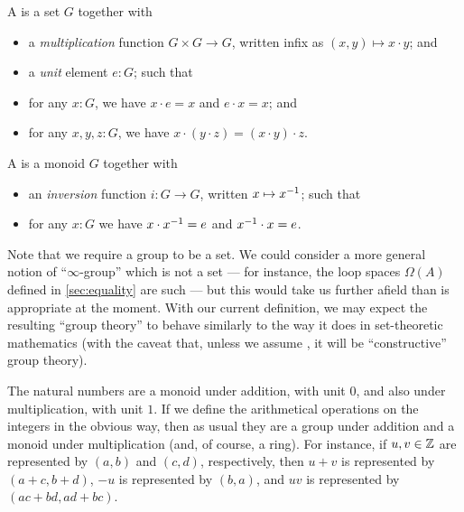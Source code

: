 \begin{defn}
  A 
  is a set $G$ together with
  \begin{itemize}
  \item a \emph{multiplication}
    function $G\times G\to G$, written infix as $(x,y) \mapsto x\cdot y$; and
  \item a \emph{unit}
    element $e:G$; such that
  \item for any $x:G$, we have $x\cdot e = x$ and $e\cdot x = x$; and
  \item for any $x,y,z:G$, we have $x\cdot (y\cdot z) = (x\cdot y)\cdot z$.
  \end{itemize}
  A 
  is a monoid $G$ together with
  \begin{itemize}
  \item an \emph{inversion} function $i:G\to G$, written $x\mapsto \mathord{{x}^{-1}}$; such that
  \item for any $x:G$ we have $x\cdot \mathord{{x}^{-1}} = e$ and $\mathord{{x}^{-1}} \cdot x = e$.
  \end{itemize}
\end{defn}

\begin{rmk}
Note that we require a group to be a set.
We could consider a more general notion of ``$\infty$-group''%
which is not a set --- for instance, the loop spaces $\Omega(A)$ defined in \autoref{sec:equality} are such --- but this would take us further afield than is appropriate at the moment.
With our current definition, we may expect the resulting ``group theory'' to behave similarly to the way it does in set-theoretic mathematics (with the caveat that, unless we assume \LEM{}, it will be ``constructive'' group theory).
\end{rmk}

\begin{eg}
  The natural numbers \N are a monoid under addition, with unit $0$, and also under multiplication, with unit $1$.
  If we define the arithmetical operations on the integers \Z in the obvious way, then as usual they are a group under addition and a monoid under multiplication (and, of course, a ring).
  For instance, if $u, v \in \mathbb{Z}$ are represented by $(a,b)$ and $(c,d)$, respectively, then $u + v$ is represented by $(a + c, b + d)$, $-u$ is represented by $(b, a)$, and $u v$ is represented by $(a c + b d, a d + b c)$.
\end{eg}

